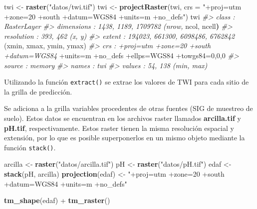 \documentclass[11pt,b5paper,]{krantz}
\newenvironment{Shaded}{}{}
\newcommand{\CommentTok}[1]{\textcolor[rgb]{0.38,0.63,0.69}{\textit{#1}}}
\newcommand{\DataTypeTok}[1]{\textcolor[rgb]{0.56,0.13,0.00}{#1}}
\newcommand{\DecValTok}[1]{\textcolor[rgb]{0.25,0.63,0.44}{#1}}
\newcommand{\ErrorTok}[1]{\textcolor[rgb]{1.00,0.00,0.00}{\textbf{#1}}}
\newcommand{\KeywordTok}[1]{\textcolor[rgb]{0.00,0.44,0.13}{\textbf{#1}}}
\newcommand{\NormalTok}[1]{#1}
\newcommand{\OperatorTok}[1]{\textcolor[rgb]{0.40,0.40,0.40}{#1}}
\newcommand{\StringTok}[1]{\textcolor[rgb]{0.25,0.44,0.63}{#1}}
\begin{document}
\begin{Shaded}
\begin{Highlighting}[]
\NormalTok{twi <-}\StringTok{ }\KeywordTok{raster}\NormalTok{(}\StringTok{"datos/twi.tif"}\NormalTok{)}
\NormalTok{twi <-}
\StringTok{  }\KeywordTok{projectRaster}\NormalTok{(twi, }
                \DataTypeTok{crs =} \StringTok{"+proj=utm +zone=20 +south}
\StringTok{                +datum=WGS84 +units=m +no_defs"}\NormalTok{)}
\NormalTok{twi}
\CommentTok{#> class : RasterLayer}
\CommentTok{#> dimensions : 1438, 1189, 1709782 (nrow,}
\NormalTok{ncol, ncell}\ErrorTok{)}
\CommentTok{#> resolution : 393, 462 (x, y)}
\CommentTok{#> extent : 194023, 661300, 6098486, 6762842}
\NormalTok{(xmin, xmax, ymin, ymax)}
\CommentTok{#> crs : +proj=utm +zone=20 +south +datum=WGS84}
\OperatorTok{+}\NormalTok{units=m }\OperatorTok{+}\NormalTok{no_defs }\OperatorTok{+}\NormalTok{ellps=WGS84 }\OperatorTok{+}\NormalTok{towgs84=}\DecValTok{0}\NormalTok{,}\DecValTok{0}\NormalTok{,}\DecValTok{0}
\CommentTok{#> source : memory}
\CommentTok{#> names : twi}
\CommentTok{#> values : 54, 138 (min, max)}
\end{Highlighting}
\end{Shaded}

Utilizando la función \texttt{extract()} se extrae los valores de TWI para cada sitio de la grilla de predicción.

\begin{Shaded}
\end{Shaded}

Se adiciona a la grilla variables procedentes de otras fuentes (SIG de muestreo de suelo). Estos datos se encuentran en los archivos raster llamados \textbf{arcilla.tif} y \textbf{pH.tif}, respectivamente. Estos raster tienen la misma resolución espacial y extensión, por lo que es posible superponerlos en un mismo objeto mediante la función \texttt{stack()}.

\begin{Shaded}
\begin{Highlighting}[]
\NormalTok{arcilla <-}\StringTok{ }\KeywordTok{raster}\NormalTok{(}\StringTok{"datos/arcilla.tif"}\NormalTok{)}
\NormalTok{pH <-}\StringTok{ }\KeywordTok{raster}\NormalTok{(}\StringTok{"datos/pH.tif"}\NormalTok{)}
\NormalTok{edaf <-}\StringTok{ }\KeywordTok{stack}\NormalTok{(pH, arcilla)}
\KeywordTok{projection}\NormalTok{(edaf) <-}
\StringTok{  "+proj=utm +zone=20 +south}
\StringTok{   +datum=WGS84 +units=m +no_defs"}

\KeywordTok{tm_shape}\NormalTok{(edaf) }\OperatorTok{+}
\StringTok{  }\KeywordTok{tm_raster}\NormalTok{()}
\end{Highlighting}
\end{Shaded}
\end{document}
